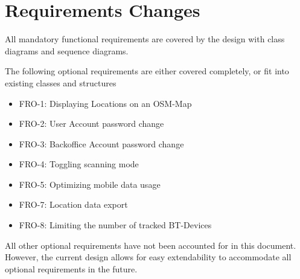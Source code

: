 \chapter{Requirements Changes}
All mandatory functional requirements are covered by the design with class diagrams and sequence diagrams.

The following optional requirements are either covered completely, or fit into existing classes and structures
\begin{itemize}
	\item FRO-1: Displaying Locations on an OSM-Map
	\item FRO-2: User Account password change
	\item FRO-3: Backoffice Account password change
	\item FRO-4: Toggling scanning mode
	\item FRO-5: Optimizing mobile data usage
	\item FRO-7: Location data export
	\item FRO-8: Limiting the number of tracked BT-Devices
\end{itemize}

All other optional requirements have not been accounted for in this document. However, the current design allows for easy extendability to accommodate all optional requirements in the future.